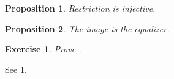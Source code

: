 \documentclass{article}
\newtheorem{proposition}{Proposition}
\newtheorem{exercise}{Exercise}
\begin{document}
\begin{proposition}\label{prop:chap:sheaves:sec:intro:injectivity of restriction maps}
    Restriction is injective.
\end{proposition}
\begin{proposition}\label{prop:chap:sheaves:sec:intro:image of restriction maps}
    The image is the equalizer.
\end{proposition}
\begin{exercise}\label{exercise:chap:sheaves:sec:intro:complete proof representables are sheaves}
    Prove .
\end{exercise}
See \cref{exercise:chap:sheaves:sec:intro:complete proof representables are sheaves}.
\end{document}
